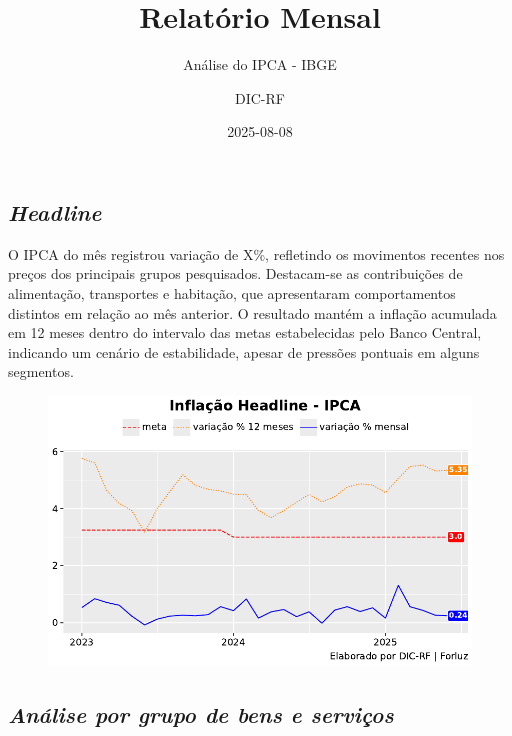 \documentclass[
  letterpaper,
  DIV=11,
  numbers=noendperiod]{scrartcl}
\title{Relatório Mensal}
\subtitle{Análise do IPCA - IBGE}
\author{DIC-RF}
\date{2025-08-08}
\begin{document}
\maketitle
\ifdefined\Shaded\renewenvironment{Shaded}{\begin{tcolorbox}[borderline west={3pt}{0pt}{shadecolor}, boxrule=0pt, enhanced, frame hidden, sharp corners, interior hidden, breakable]}{\end{tcolorbox}}\fi

\hypertarget{headline}{%
\subsection{\texorpdfstring{\emph{Headline}}{Headline}}\label{headline}}

O IPCA do mês registrou variação de X\%, refletindo os movimentos
recentes nos preços dos principais grupos pesquisados. Destacam-se as
contribuições de alimentação, transportes e habitação, que apresentaram
comportamentos distintos em relação ao mês anterior. O resultado mantém
a inflação acumulada em 12 meses dentro do intervalo das metas
estabelecidas pelo Banco Central, indicando um cenário de estabilidade,
apesar de pressões pontuais em alguns segmentos.

\begin{figure}

{\centering \includegraphics{Projeto IPCA Conjuntura_files/figure-pdf/cell-5-output-1.pdf}

}

\end{figure}

\hypertarget{anuxe1lise-por-grupo-de-bens-e-serviuxe7os}{%
\subsection{\texorpdfstring{\emph{Análise por grupo de bens e
serviços}}{Análise por grupo de bens e serviços}}\label{anuxe1lise-por-grupo-de-bens-e-serviuxe7os}}
\end{document}
